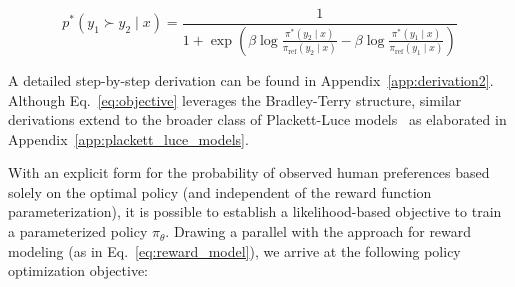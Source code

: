 \begin{equation}\label{eq:objective}
    p^*(y_1\succ y_2 \mid x)=\frac{1}{1 + \exp\left(\beta \log \frac{\pi^*(y_2\mid x)}{\pi_\text{ref}(y_2\mid x)} - \beta \log \frac{\pi^*(y_1\mid x)}{\pi_\text{ref}(y_1\mid x)}\right)}
\end{equation}

A detailed step-by-step derivation can be found in Appendix~\ref{app:derivation2}. Although Eq.~\ref{eq:objective} leverages the Bradley-Terry structure, similar derivations extend to the broader class of Plackett-Luce models~\citep{plackett1975analysis, luce2012individual} as elaborated in Appendix~\ref{app:plackett_luce_models}.

With an explicit form for the probability of observed human preferences based solely on the optimal policy (and independent of the reward function parameterization), it is possible to establish a likelihood-based objective to train a parameterized policy $\pi_\theta$. Drawing a parallel with the approach for reward modeling (as in Eq.~\ref{eq:reward_model}), we arrive at the following policy optimization objective:

